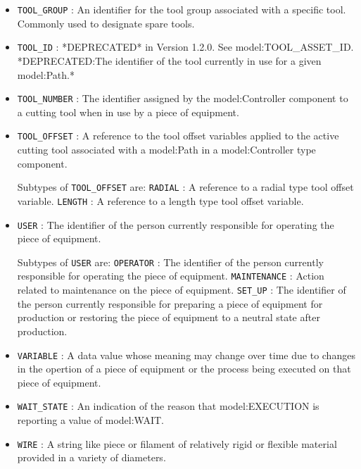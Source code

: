 \begin{itemize}
\item \texttt{TOOL_GROUP} : An identifier for the tool group associated with a specific tool. Commonly used to designate spare tools. 

\item \texttt{TOOL_ID} : *DEPRECATED* in Version 1.2.0.   See {model:TOOL_ASSET_ID}. *DEPRECATED:The identifier of the tool currently in use for a given {model:Path}.* 

\item \texttt{TOOL_NUMBER} : The identifier assigned by the {model:Controller} component to a cutting tool when in use by a piece of equipment. 

\item \texttt{TOOL_OFFSET} : A reference to the tool offset variables applied to the active cutting tool associated with a {model:Path} in a {model:Controller} type component. 

Subtypes of \texttt{TOOL_OFFSET} are: 
\newline\tab \texttt{RADIAL} : A reference to a radial type tool offset variable. 
\newline\tab \texttt{LENGTH} : A reference to a length type tool offset variable. 
\item \texttt{USER} : The identifier of the person currently responsible for operating the piece of equipment. 

Subtypes of \texttt{USER} are: 
\newline\tab \texttt{OPERATOR} : The identifier of the person currently responsible for operating the piece of equipment. 
\newline\tab \texttt{MAINTENANCE} : Action related to maintenance on the piece of equipment. 
\newline\tab \texttt{SET_UP} : The identifier of the person currently responsible for preparing a piece of equipment for production or restoring the piece of equipment to a neutral state after production. 
\item \texttt{VARIABLE} : A data value whose meaning may change over time due to changes in the opertion of a piece of equipment or the process being executed on that piece of equipment. 

\item \texttt{WAIT_STATE} : An indication of the reason that {model:EXECUTION} is reporting a value of {model:WAIT}. 

\item \texttt{WIRE} : A string like piece or filament of relatively rigid or flexible material provided in a variety of diameters. 


\end{itemize}
